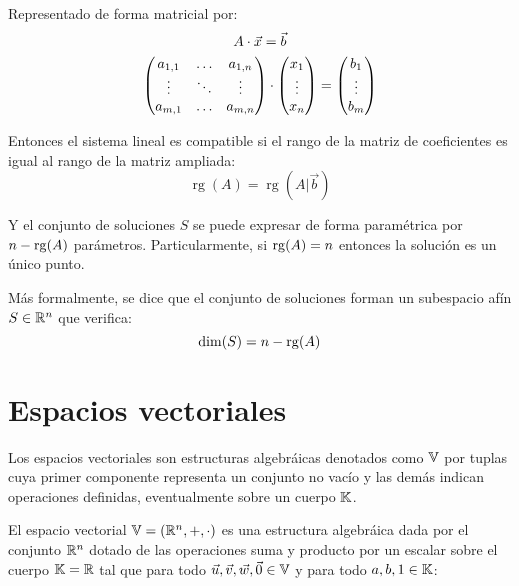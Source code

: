 \documentclass[a5paper,12pt,twoside]{book}
\begin{document}
Representado de forma matricial por:
\begin{gather*}
    A \cdot \Vec{x} = \Vec{b}
    \\
    \begin{pmatrix}
        a_{1,1} & \dots & a_{1,n}
        \\
        \vdots & \ddots & \vdots
        \\
        a_{m,1} & \dots & a_{m,n}
    \end{pmatrix}
    \cdot
    \begin{pmatrix}
        x_1
        \\
        \vdots
        \\
        x_n
    \end{pmatrix}
    =
    \begin{pmatrix}
        b_1
        \\
        \vdots
        \\
        b_m
    \end{pmatrix}
\end{gather*}

Entonces el sistema lineal es compatible si el rango de la matriz de coeficientes es igual al rango de la matriz ampliada:
\begin{equation*}
    \operatorname{rg}(A) = \operatorname{rg}\left(A\Big|\Vec{b}\right)
\end{equation*}

Y el conjunto de soluciones $S$ se puede expresar de forma paramétrica por $n-\operatorname{rg}(A)$ parámetros. Particularmente, si $\operatorname{rg}(A)=n$ entonces la solución es un único punto.

Más formalmente, se dice que el conjunto de soluciones forman un subespacio afín $S\in\mathbb{R}^n$ que verifica:
\begin{equation*}
    \operatorname{dim}(S) = n-\operatorname{rg}(A)
\end{equation*}



\chapter{Espacios vectoriales}

Los espacios vectoriales son estructuras algebráicas denotados como $\mathbb{V}$ por tuplas cuya primer componente representa un conjunto no vacío y las demás indican operaciones definidas, eventualmente sobre un cuerpo $\mathbb{K}$.

El espacio vectorial $\mathbb{V}=(\mathbb{R}^n,+,\cdot)$ es una estructura algebráica dada por el conjunto $\mathbb{R}^n$ dotado de las operaciones suma y producto por un escalar sobre el cuerpo $\mathbb{K}=\mathbb{R}$ tal que para todo $ \Vec{u},\Vec{v},\Vec{w},\Vec{0} \in \mathbb{V}$ y para todo $a,b,1 \in \mathbb{K}$:
\end{document}
